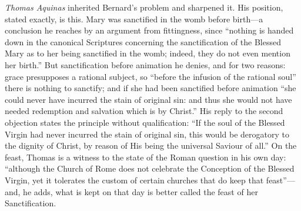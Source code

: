 \emph{Thomas Aquinas} inherited Bernard's problem and sharpened it. His
position, stated exactly, is this. Mary was sanctified in the womb before
birth---a conclusion he reaches by an argument from fittingness, since
``nothing is handed down in the canonical Scriptures concerning the
sanctification of the Blessed Mary as to her being sanctified in the
womb; indeed, they do not even mention her birth.'' But
sanctification before animation he denies, and for two reasons: grace
presupposes a rational subject, so ``before the infusion of the rational
soul'' there is nothing to sanctify; and if she had been sanctified
before animation ``she could never have incurred the stain of original
sin: and thus she would not have needed redemption and salvation which is
by Christ.'' His reply to the second objection states the principle
without qualification: ``If the soul of the Blessed Virgin had never
incurred the stain of original sin, this would be derogatory to the
dignity of Christ, by reason of His being the universal Saviour of
all.'' On the feast, Thomas is a witness to the state of the
Roman question in his own day: ``although the Church of Rome does not
celebrate the Conception of the Blessed Virgin, yet it tolerates the
custom of certain churches that do keep that feast''---and, he adds, what
is kept on that day is better called the feast of her
Sanctification.

